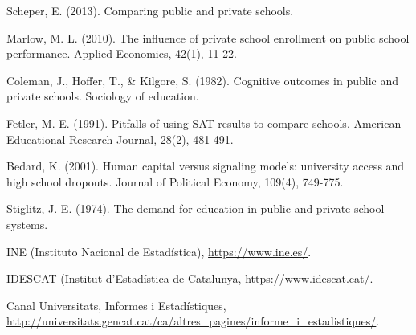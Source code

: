\documentclass[12pt]{article}
\begin{document}
\newpage
\begin{thebibliography}{9}

Scheper, E. (2013). Comparing public and private schools.

Marlow, M. L. (2010). The influence of private school enrollment on public school performance. Applied Economics, 42(1), 11-22.

Coleman, J., Hoffer, T., \& Kilgore, S. (1982). Cognitive outcomes in public and private schools. Sociology of education.

Fetler, M. E. (1991). Pitfalls of using SAT results to compare schools. American Educational Research Journal, 28(2), 481-491.

Bedard, K. (2001). Human capital versus signaling models: university access and high school dropouts. Journal of Political Economy, 109(4), 749-775.

Stiglitz, J. E. (1974). The demand for education in public and private school systems.

INE (Instituto Nacional de Estad\'{i}stica),  \url{https://www.ine.es/}.

IDESCAT (Institut d'Estad\'{i}stica de Catalunya, \url{https://www.idescat.cat/}.

Canal Universitats, Informes i Estad\'{i}stiques, \url{http://universitats.gencat.cat/ca/altres_pagines/informe_i_estadistiques/}.

\end{thebibliography}

\newpage
\listoftables
\end{document}
